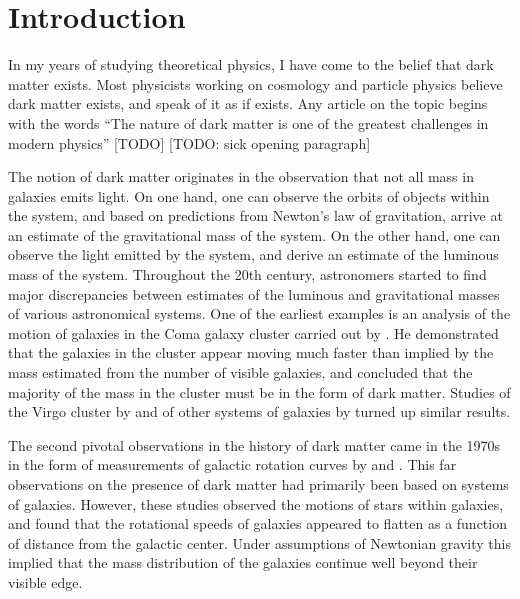 \documentclass[b5paper, 10pt, twoside]{book}
\newcommand{\typographersred}{scp-red-dark-3}
\newcommand{\todo}[1][]{%
   \ifthenelse{ \equal{#1}{} }
      {\textcolor{\typographersred}{[TODO]}}
      {\textcolor{\typographersred}{[TODO: #1]}}
}
\begin{document}
\cleardoublepage
\mainmatter

\chapter{Introduction}

In my years of studying theoretical physics, I have come to the belief that dark matter exists. Most physicists working on cosmology and particle physics believe dark matter exists, and speak of it as if exists. Any article on the topic begins with the words ``The nature of dark matter is one of the greatest challenges in modern physics''\todo[sick opening paragraph]

The notion of dark matter originates in the observation that not all mass in galaxies emits light. On one hand, one can observe the orbits of objects within the system, and based on predictions from Newton's law of gravitation, arrive at an estimate of the gravitational mass of the system. On the other hand, one can observe the light emitted by the system, and derive an estimate of the luminous mass of the system. Throughout the 20th century, astronomers started to find major discrepancies between estimates of the luminous and gravitational masses of various astronomical systems. One of the earliest examples is an analysis of the motion of galaxies in the Coma galaxy cluster carried out by \textcite{Zwicky1933}. He demonstrated that the galaxies in the cluster appear moving much faster than implied by the mass estimated from the number of visible galaxies, and concluded that the majority of the mass in the cluster must be in the form of dark matter. Studies of the Virgo cluster by \textcite{Smith1936} and of other systems of galaxies by \textcite{Holmberg1937} turned up similar results.

The second pivotal observations in the history of dark matter came in the 1970s in the form of measurements of galactic rotation curves by \textcite{RubinFord1970} and \textcite{Freeman1970}. This far observations on the presence of dark matter had primarily been based on systems of galaxies. However, these studies observed the motions of stars within galaxies, and found that the rotational speeds of galaxies appeared to flatten as a function of distance from the galactic center. Under assumptions of Newtonian gravity this implied that the mass distribution of the galaxies continue well beyond their visible edge.
\end{document}
